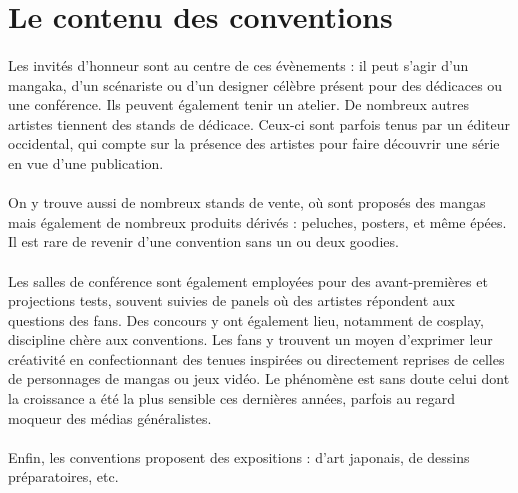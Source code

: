 \section{Le contenu des conventions}
\paragraph{}
Les invités d’honneur sont au centre de ces évènements : il peut s’agir d’un mangaka, d’un scénariste ou d’un designer célèbre présent pour des dédicaces ou une conférence. Ils peuvent également tenir un atelier. De nombreux autres artistes tiennent des stands de dédicace. Ceux-ci sont parfois tenus par un éditeur occidental, qui compte sur la présence des artistes pour faire découvrir une série en vue d’une publication.
\paragraph{}
On y trouve aussi de nombreux stands de vente, où sont proposés des mangas mais également de nombreux produits dérivés : peluches, posters, et même épées. Il est rare de revenir d’une convention sans un ou deux goodies.
\paragraph{}
Les salles de conférence sont également employées pour des avant-premières et projections tests, souvent suivies de panels où des artistes répondent aux questions des fans. Des concours y ont également lieu, notamment de cosplay, discipline chère aux conventions. Les fans y trouvent un moyen d’exprimer leur créativité en confectionnant des tenues inspirées ou directement reprises de celles de personnages de mangas ou jeux vidéo. Le phénomène est sans doute celui dont la croissance a été la plus sensible ces dernières années, parfois au regard moqueur des médias généralistes.
\paragraph{}
Enfin, les conventions proposent des expositions : d’art japonais, de dessins préparatoires, etc.